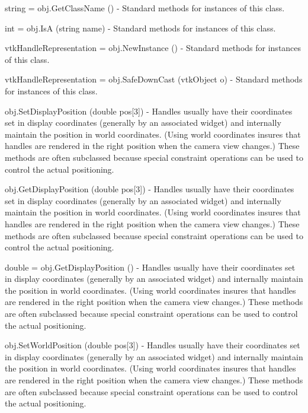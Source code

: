 \begin{DoxyItemize}
\item {\ttfamily string = obj.\-Get\-Class\-Name ()} -\/ Standard methods for instances of this class.  
\item {\ttfamily int = obj.\-Is\-A (string name)} -\/ Standard methods for instances of this class.  
\item {\ttfamily vtk\-Handle\-Representation = obj.\-New\-Instance ()} -\/ Standard methods for instances of this class.  
\item {\ttfamily vtk\-Handle\-Representation = obj.\-Safe\-Down\-Cast (vtk\-Object o)} -\/ Standard methods for instances of this class.  
\item {\ttfamily obj.\-Set\-Display\-Position (double pos\mbox{[}3\mbox{]})} -\/ Handles usually have their coordinates set in display coordinates (generally by an associated widget) and internally maintain the position in world coordinates. (Using world coordinates insures that handles are rendered in the right position when the camera view changes.) These methods are often subclassed because special constraint operations can be used to control the actual positioning.  
\item {\ttfamily obj.\-Get\-Display\-Position (double pos\mbox{[}3\mbox{]})} -\/ Handles usually have their coordinates set in display coordinates (generally by an associated widget) and internally maintain the position in world coordinates. (Using world coordinates insures that handles are rendered in the right position when the camera view changes.) These methods are often subclassed because special constraint operations can be used to control the actual positioning.  
\item {\ttfamily double = obj.\-Get\-Display\-Position ()} -\/ Handles usually have their coordinates set in display coordinates (generally by an associated widget) and internally maintain the position in world coordinates. (Using world coordinates insures that handles are rendered in the right position when the camera view changes.) These methods are often subclassed because special constraint operations can be used to control the actual positioning.  
\item {\ttfamily obj.\-Set\-World\-Position (double pos\mbox{[}3\mbox{]})} -\/ Handles usually have their coordinates set in display coordinates (generally by an associated widget) and internally maintain the position in world coordinates. (Using world coordinates insures that handles are rendered in the right position when the camera view changes.) These methods are often subclassed because special constraint operations can be used to control the actual positioning.  

\end{DoxyItemize}
